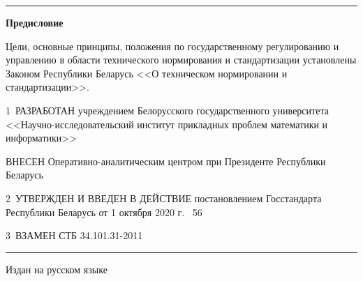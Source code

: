 \hrule 

\rule{0pt}{5mm}
 
\centerline{\bf Предисловие} 

Цели, основные принципы, положения по государственному регулированию и 
управлению в области технического нормирования и стандартизации 
установлены Законом Республики Беларусь <<О техническом нормировании и 
стандартизации>>.  

1~РАЗРАБОТАН учреждением Белорусского государственного университета 
<<Науч\-но-исследовательский институт прикладных проблем математики и 
информатики>> 

ВНЕСЕН Оперативно-аналитическим центром при Президенте Республики Беларусь 

2~УТВЕРЖДЕН И ВВЕДЕН В ДЕЙСТВИЕ постановлением Госстандарта Республики 
Беларусь от 1 октября 2020 г. \No~56

3~ВЗАМЕН СТБ 34.101.31-2011 


\vfill

\hrule
\vskip1mm
Издан на русском языке

\pagebreak
